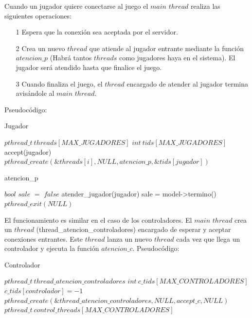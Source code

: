 Cuando un jugador quiere conectarse al juego el $main$ $thread$ realiza las siguientes operaciones:

\begin{itemize}
	\item[1] Espera que la conexión sea aceptada por el servidor.
	\item[2] Crea un nuevo $thread$ que atiende al jugador entrante mediante la función $atencion\_p$ (Habrá tantos $threads$ como jugadores haya en el sistema). El jugador será atendido hasta que finalice el juego.
	\item[3] Cuando finaliza el juego, el $thread$ encargado de atender al jugador termina avisándole al $main$ $thread$.
\end{itemize}

Pseudocódigo:

\begin{algorithm}[H]
\caption{Jugador}\label{ej1}
\begin{algorithmic}[1]
	\State $pthread\_t \ threads[MAX\_JUGADORES]$ 
	\State $int \ tids[MAX\_JUGADORES]$
		\State accept(jugador)
		\State $pthread\_create(\&threads[i],NULL,atencion\_p,\&tids[jugador])$
	\EndFor
\EndProcedure
\end{algorithmic}
\end{algorithm}

\begin{algorithm}[H]
\caption{atencion\_p}\label{ej1}
\begin{algorithmic}[1]
	\State $bool$ $sale$ $=$ $false$ 
		\State atender\_jugador(jugador)
		\State sale = model->termino()
	\EndWhile
	\State $pthread\_exit(NULL)$
\EndProcedure
\end{algorithmic}
\end{algorithm}

El funcionamiento es similar en el caso de los controladores. El $main$ $thread$ crea un $thread$ (thread\_atencion\_controladores) encargado de esperar y aceptar conexiones entrantes. Este $thread$ lanza un nuevo $thread$ cada vez que llega un controlador y ejecuta la función $atencion\_c$. Pseudocódigo:

\begin{algorithm}[H]
\caption{Controlador}\label{ej1}
\begin{algorithmic}[1]
	\State $pthread\_t  \ thread\_atencion\_controladores$
	\State $int \ c\_tids[MAX\_CONTROLADORES]$
		\State $c\_tids[controlador]= -1$
	\EndFor
	\State $pthread\_create(\&thread\_atencion\_controladores,NULL,accept\_c,NULL)$
	\State $pthread\_t \ control\_threads[MAX\_CONTROLADORES]$
\EndProcedure
\end{algorithmic}
\end{algorithm}

